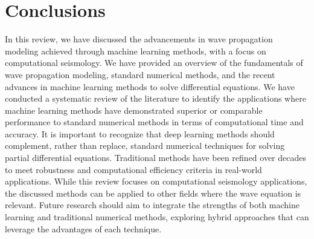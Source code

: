 \documentclass[11pt,twoside]{article}
\begin{document}
\section{Conclusions}\label{sec:conclusions}

In this review, we have discussed the advancements in wave propagation modeling achieved through machine learning
methods, with a focus on computational seismology. We have provided an overview of the fundamentals of wave
propagation modeling, standard numerical methods, and the recent advances in machine learning methods to solve
differential equations. We have conducted a systematic review of the literature to identify the applications where
machine learning methods have demonstrated superior or comparable performance to standard numerical methods in terms
of computational time and accuracy. It is important to recognize that deep learning methods should complement, 
rather than replace, standard numerical techniques for solving partial differential equations. Traditional methods 
have been refined over decades to meet robustness and computational efficiency criteria in real-world applications. 
While this review focuses on computational seismology applications, the discussed methods can be applied to other 
fields where the wave equation is relevant. Future research should aim to integrate the strengths of both machine 
learning and traditional numerical methods, exploring hybrid approaches that can leverage the advantages of each 
technique.


\end{document}
